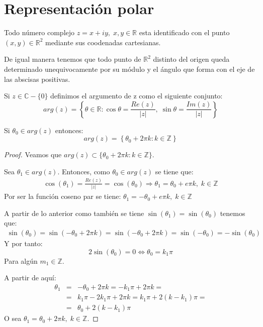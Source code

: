 \section{Representación polar}
Todo número complejo \(z=x+iy, \; x,y \in \mathbb{R}\) esta identificado con el punto \((x,y)\in \mathbb{R}^{2}\) mediante sus coodenadas cartesianas.

De igual manera tenemos que todo punto de \(\mathbb{R}^{2}\) distinto del origen queda determinado unequivocamente por su módulo y el ángulo que forma con el eje de las abscisas positivas.


\begin{definicion}[Argumento]

  Si \(z \in \mathbb{C}-\{0\}\) definimos el argumento de z como el siguiente conjunto:
  \[arg(z) = \left\{ \theta \in \mathbb{R} : \cos{\theta}=\frac{Re(z)}{|z|}, \; \sin{\theta}=\frac{Im(z)}{|z|}\right\}\]
\end{definicion}

\begin{proposicion}
 Si \(\theta_0 \in arg(z)\) entonces:
 \[arg(z)= \left\{ \theta_0+2\pi k : k \in \mathbb{Z} \right\}\]
\end{proposicion}
\begin{proof}
  Veamos que \(arg(z)\subset \{\theta_0 +2 \pi k : k \in \mathbb{Z}\}\).

  Sea \(\theta_1 \in arg(z)\). Entonces, como \(\theta_0 \in arg(z)\) se tiene que:
  \begin{eqnarray*}
    \cos(\theta_1) = \frac{Re(z)}{|z|} = \cos(\theta_0) \Rightarrow \theta_1 = \theta_0 + e \pi k, \; k \in \mathbb{Z}
  \end{eqnarray*}
  Por ser la función coseno par se tiene: \(\theta_1 = -\theta_0 + e \pi k, \; k \in \mathbb{Z}\)

  A partir de lo anterior como también se tiene \( \sin(\theta_1) = \sin(\theta_0)\) tenemos que:
  \begin{eqnarray*}
    \sin(\theta_0) = \sin(-\theta_0+2\pi k ) = \sin(-\theta_0+2\pi k) = \sin(-\theta_0) = -\sin(\theta_0)
  \end{eqnarray*}
  Y por tanto:
  \[2\sin(\theta_0)=0 \Leftrightarrow \theta_0=k_1\pi\]
  Para algún \(m_1\in \mathbb{Z}\).
  
  A partir de aquí:
  \begin{eqnarray*}
    \theta_1 & = & -\theta_0 + 2\pi k = -k_1 \pi + 2\pi k = \\
             & = & k_1 \pi -2 k_1\pi + 2\pi k = k_1 \pi +2(k-k_1) \pi = \\
             & = & \theta_0+2(k-k_1)\pi
  \end{eqnarray*}
  O sea \(\theta_1=\theta_0+2\pi k , \; k\in \mathbb{Z}\).
\end{proof}

